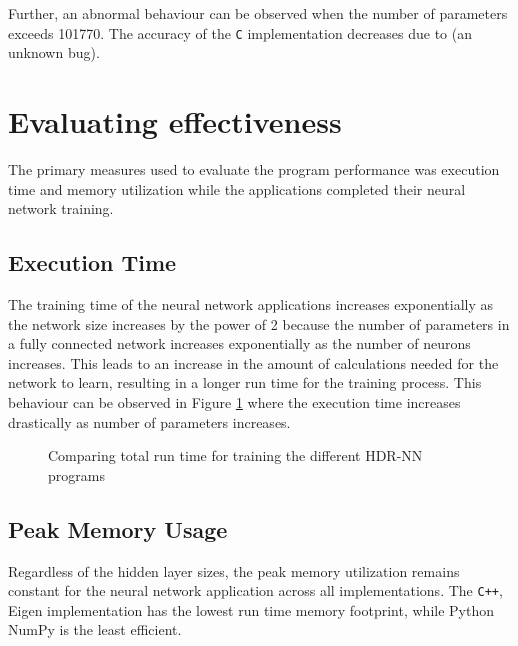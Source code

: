 Further, an abnormal behaviour can be observed when the number of parameters exceeds 101770. The accuracy of the \texttt{C} implementation decreases due to (an unknown bug).



\section{Evaluating effectiveness}

The primary measures used to evaluate the program performance was execution time and memory utilization while the applications completed their neural network training.

\subsection{Execution Time}
The training time of the neural network applications increases exponentially as the network size increases by the power of 2 because the number of parameters in a fully connected network increases exponentially as the number of neurons increases. This leads to an increase in the amount of calculations needed for the network to learn, resulting in a longer run time for the training process. This behaviour can be observed in Figure \ref{hdrnn-exectime} where the execution time increases drastically as number of parameters increases.

\begin{figure}[!ht]
	\centering
	
	\caption[Execution Time vs Model Parameters]{Comparing total run time for training the different HDR-NN programs}
	\label{hdrnn-exectime}
\end{figure}

\subsection{Peak Memory Usage}
Regardless of the hidden layer sizes, the peak memory utilization remains constant for the neural network application across all implementations. The \texttt{C++}, Eigen implementation has the lowest run time memory footprint, while Python NumPy is the least efficient.

